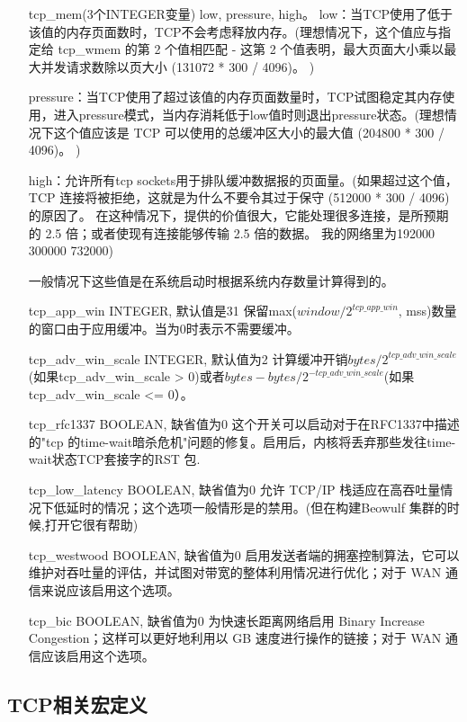 \begin{enumerate}
\item[tcp\_mem(3个INTEGER变量)] low, pressure, high。
low：当TCP使用了低于该值的内存页面数时，TCP不会考虑释放内存。(理想情况下，这个值应与指定给 tcp\_wmem 的第 2 个值相匹配 - 这第 2 个值表明，最大页面大小乘以最大并发请求数除以页大小 (131072 * 300 / 4096)。 )

pressure：当TCP使用了超过该值的内存页面数量时，TCP试图稳定其内存使用，进入pressure模式，当内存消耗低于low值时则退出pressure状态。(理想情况下这个值应该是 TCP 可以使用的总缓冲区大小的最大值 (204800 * 300 / 4096)。 )

high：允许所有tcp sockets用于排队缓冲数据报的页面量。(如果超过这个值，TCP 连接将被拒绝，这就是为什么不要令其过于保守 (512000 * 300 / 4096) 的原因了。 在这种情况下，提供的价值很大，它能处理很多连接，是所预期的 2.5 倍；或者使现有连接能够传输 2.5 倍的数据。 我的网络里为192000 300000 732000)

一般情况下这些值是在系统启动时根据系统内存数量计算得到的。

\item[tcp\_app\_win] INTEGER,
默认值是31
保留max($window/2^{tcp\_app\_win}$, mss)数量的窗口由于应用缓冲。当为0时表示不需要缓冲。

\item[tcp\_adv\_win\_scale] INTEGER,
默认值为2
计算缓冲开销$bytes/2^{tcp\_adv\_win\_scale}$(如果tcp\_adv\_win\_scale > 0)或者$bytes-bytes/2^{-tcp\_adv\_win\_scale}$(如果tcp\_adv\_win\_scale <= 0）。

\item[tcp\_rfc1337] BOOLEAN,
缺省值为0
这个开关可以启动对于在RFC1337中描述的"tcp 的time-wait暗杀危机"问题的修复。启用后，内核将丢弃那些发往time-wait状态TCP套接字的RST 包.

\item[tcp\_low\_latency]  BOOLEAN,
缺省值为0
允许 TCP/IP 栈适应在高吞吐量情况下低延时的情况；这个选项一般情形是的禁用。(但在构建Beowulf 集群的时候,打开它很有帮助)

\item[tcp\_westwood] BOOLEAN,
缺省值为0
启用发送者端的拥塞控制算法，它可以维护对吞吐量的评估，并试图对带宽的整体利用情况进行优化；对于 WAN 通信来说应该启用这个选项。

\item[tcp\_bic] BOOLEAN,
缺省值为0
为快速长距离网络启用 Binary Increase Congestion；这样可以更好地利用以 GB 速度进行操作的链接；对于 WAN 通信应该启用这个选项。
\end{enumerate}
    \subsection{TCP相关宏定义}

